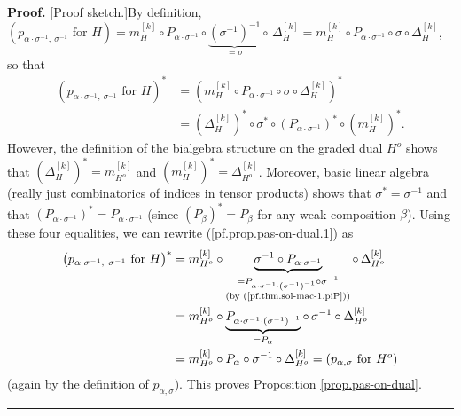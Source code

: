 \documentclass[numbers=enddot,12pt,final,onecolumn,notitlepage]{scrartcl}%
\theoremstyle{definition}
\newenvironment{proof}[1][Proof]{\noindent\textbf{#1.} }{\ \rule{0.5em}{0.5em}}
\begin{document}
\begin{proof}
[Proof sketch.]By definition, $\left(  p_{\alpha\cdot\sigma^{-1},\ \sigma
^{-1}}\text{ for }H\right)  =m_{H}^{\left[  k\right]  }\circ P_{\alpha
\cdot\sigma^{-1}}\circ\underbrace{\left(  \sigma^{-1}\right)  ^{-1}}_{=\sigma
}\circ\,\Delta_{H}^{\left[  k\right]  }=m_{H}^{\left[  k\right]  }\circ
P_{\alpha\cdot\sigma^{-1}}\circ\sigma\circ\Delta_{H}^{\left[  k\right]  }$, so
that%
\begin{align}
\left(  p_{\alpha\cdot\sigma^{-1},\ \sigma^{-1}}\text{ for }H\right)  ^{\ast}
&  =\left(  m_{H}^{\left[  k\right]  }\circ P_{\alpha\cdot\sigma^{-1}}%
\circ\sigma\circ\Delta_{H}^{\left[  k\right]  }\right)  ^{\ast}\nonumber\\
&  =\left(  \Delta_{H}^{\left[  k\right]  }\right)  ^{\ast}\circ\sigma^{\ast
}\circ\left(  P_{\alpha\cdot\sigma^{-1}}\right)  ^{\ast}\circ\left(
m_{H}^{\left[  k\right]  }\right)  ^{\ast}. \label{pf.prop.pas-on-dual.1}%
\end{align}
However, the definition of the bialgebra structure on the graded dual $H^{o}$
shows that $\left(  \Delta_{H}^{\left[  k\right]  }\right)  ^{\ast}=m_{H^{o}%
}^{\left[  k\right]  }$ and $\left(  m_{H}^{\left[  k\right]  }\right)
^{\ast}=\Delta_{H^{o}}^{\left[  k\right]  }$. Moreover, basic linear algebra
(really just combinatorics of indices in tensor products) shows that
$\sigma^{\ast}=\sigma^{-1}$ and that $\left(  P_{\alpha\cdot\sigma^{-1}%
}\right)  ^{\ast}=P_{\alpha\cdot\sigma^{-1}}$ (since $\left(  P_{\beta
}\right)  ^{\ast}=P_{\beta}$ for any weak composition $\beta$). Using these
four equalities, we can rewrite (\ref{pf.prop.pas-on-dual.1}) as%
\begin{align*}
\left(  p_{\alpha\cdot\sigma^{-1},\ \sigma^{-1}}\text{ for }H\right)  ^{\ast}
&  =m_{H^{o}}^{\left[  k\right]  }\circ\underbrace{\sigma^{-1}\circ
P_{\alpha\cdot\sigma^{-1}}}_{\substack{=P_{\alpha\cdot\sigma^{-1}\cdot\left(
\sigma^{-1}\right)  ^{-1}}\circ\sigma^{-1}\\\text{(by
(\ref{pf.thm.sol-mac-1.piP}))}}}\circ\,\Delta_{H^{o}}^{\left[  k\right]  }\\
&  =m_{H^{o}}^{\left[  k\right]  }\circ\underbrace{P_{\alpha\cdot\sigma
^{-1}\cdot\left(  \sigma^{-1}\right)  ^{-1}}}_{=P_{\alpha}}\circ\,\sigma
^{-1}\circ\Delta_{H^{o}}^{\left[  k\right]  }\\
&  =m_{H^{o}}^{\left[  k\right]  }\circ P_{\alpha}\circ\sigma^{-1}\circ
\Delta_{H^{o}}^{\left[  k\right]  }=\left(  p_{\alpha,\sigma}\text{ for }%
H^{o}\right)
\end{align*}
(again by the definition of $p_{\alpha,\sigma}$). This proves Proposition
\ref{prop.pas-on-dual}.
\end{proof}
\end{document}
